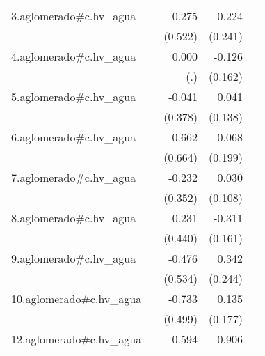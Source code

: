 {\begin{longtable}{l*{4}{D{.}{.}{-1}}}
\addlinespace
3.aglomerado#c.hv\_agua&                     &       0.275         &       0.224         &                     \\
            &                     &     (0.522)         &     (0.241)         &                     \\
\addlinespace
4.aglomerado#c.hv\_agua&                     &       0.000         &      -0.126         &                     \\
            &                     &         (.)         &     (0.162)         &                     \\
\addlinespace
5.aglomerado#c.hv\_agua&                     &      -0.041         &       0.041         &                     \\
            &                     &     (0.378)         &     (0.138)         &                     \\
\addlinespace
6.aglomerado#c.hv\_agua&                     &      -0.662         &       0.068         &                     \\
            &                     &     (0.664)         &     (0.199)         &                     \\
\addlinespace
7.aglomerado#c.hv\_agua&                     &      -0.232         &       0.030         &                     \\
            &                     &     (0.352)         &     (0.108)         &                     \\
\addlinespace
8.aglomerado#c.hv\_agua&                     &       0.231         &      -0.311         &                     \\
            &                     &     (0.440)         &     (0.161)         &                     \\
\addlinespace
9.aglomerado#c.hv\_agua&                     &      -0.476         &       0.342         &                     \\
            &                     &     (0.534)         &     (0.244)         &                     \\
\addlinespace
10.aglomerado#c.hv\_agua&                     &      -0.733         &       0.135         &                     \\
            &                     &     (0.499)         &     (0.177)         &                     \\
\addlinespace
12.aglomerado#c.hv\_agua&                     &      -0.594         &      -0.906\sym{***}&                     \\

\end{longtable}}
